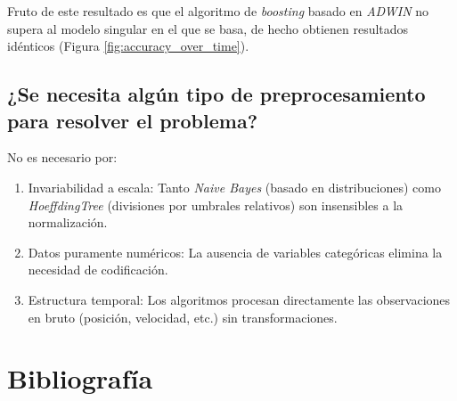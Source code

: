 \documentclass[12pt,letterpaper]{article}
\begin{document}
Fruto de este resultado es que el algoritmo de \textit{boosting} basado en \textit{ADWIN} no supera al modelo singular en el que se basa, de hecho obtienen resultados idénticos (Figura \ref{fig:accuracy_over_time}).

\subsection{¿Se necesita algún tipo de preprocesamiento para resolver el problema?}
No es necesario por:
\begin{enumerate}
    \item Invariabilidad a escala: Tanto \textit{Naive Bayes} (basado en distribuciones) como \textit{HoeffdingTree} (divisiones por umbrales relativos) son insensibles a la normalización.
    \item Datos puramente numéricos: La ausencia de variables categóricas elimina la necesidad de codificación.
    \item Estructura temporal: Los algoritmos procesan directamente las observaciones en bruto (posición, velocidad, etc.) sin transformaciones.
\end{enumerate}

\newpage
\section{Bibliografía}

\printbibliography[heading=none, category=cited]
\end{document}
